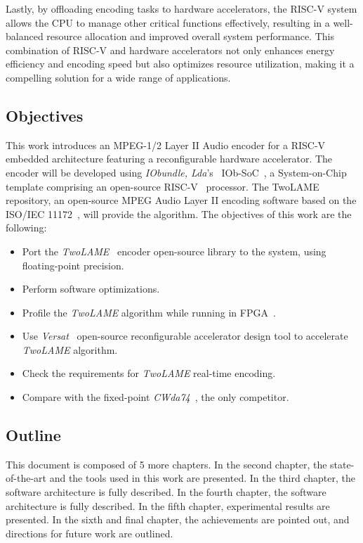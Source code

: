 Lastly, by offloading encoding tasks to hardware accelerators, the RISC-V system allows the CPU to manage other critical functions effectively, resulting in a well-balanced resource allocation and improved overall system performance.  This combination of RISC-V and hardware accelerators not only enhances energy efficiency and encoding speed but also optimizes resource utilization, making it a compelling solution for a wide range of applications.


\subsection{Objectives}

This work introduces an MPEG-1/2 Layer II Audio encoder for a RISC-V embedded architecture
featuring a reconfigurable hardware accelerator. The encoder will be developed using \textit{IObundle, Lda}'s~\cite{iobundle} IOb-SoC~\cite{bib:iobsoc-github}, a System-on-Chip template comprising an open-source RISC-V~\cite{riscv} processor. The TwoLAME~\cite{twolamerepo} repository, an open-source MPEG Audio Layer II encoding software based on the ISO/IEC 11172~\cite{11172}, will provide the algorithm.
The objectives of this work are the following:

\begin{itemize}
    \item Port the \textit{TwoLAME}~\cite{bib:twolame} encoder open-source library to the system, using floating-point precision.
    \item Perform software optimizations.
    \item Profile the \textit{TwoLAME} algorithm while running in FPGA~\cite{fpga}.
    \item Use \textit{Versat}~\cite{bib:iobversat} open-source reconfigurable accelerator design tool to accelerate \textit{TwoLAME} algorithm.
    \item Check the requirements for \textit{TwoLAME} real-time encoding.
    \item Compare with the fixed-point \textit{CWda74}~\cite{CWda74}, the only competitor.
\end{itemize}

\subsection{Outline}

This document is composed of 5 more chapters. In the second chapter, the state-of-the-art and the tools used in this work are presented. In the third chapter, the software architecture is fully described. In the fourth chapter, the software architecture is fully described. In the fifth chapter, experimental results are presented. In the sixth and final chapter, the achievements are pointed out, and directions for future work are outlined.





